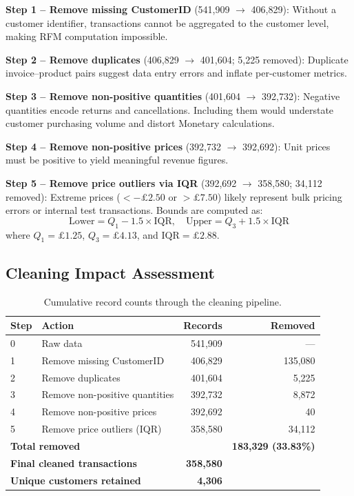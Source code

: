 \documentclass[10pt,a4paper]{article}
\begin{document}
\textbf{Step 1 -- Remove missing CustomerID} (541,909 $\to$ 406,829): Without a
customer identifier, transactions cannot be aggregated to the customer level, making
RFM computation impossible.

\textbf{Step 2 -- Remove duplicates} (406,829 $\to$ 401,604; 5,225 removed): Duplicate
invoice--product pairs suggest data entry errors and inflate per-customer metrics.

\textbf{Step 3 -- Remove non-positive quantities} (401,604 $\to$ 392,732): Negative
quantities encode returns and cancellations.  Including them would understate customer
purchasing volume and distort Monetary calculations.

\textbf{Step 4 -- Remove non-positive prices} (392,732 $\to$ 392,692): Unit prices
must be positive to yield meaningful revenue figures.

\textbf{Step 5 -- Remove price outliers via IQR} (392,692 $\to$ 358,580; 34,112
removed): Extreme prices ($< -\pounds2.50$ or $> \pounds7.50$) likely represent bulk
pricing errors or internal test transactions.  Bounds are computed as:
\[
  \text{Lower} = Q_1 - 1.5 \times \text{IQR}, \quad
  \text{Upper} = Q_3 + 1.5 \times \text{IQR}
\]
where $Q_1 = \pounds1.25$, $Q_3 = \pounds4.13$, and $\text{IQR} = \pounds2.88$.

\subsection{Cleaning Impact Assessment}

\begin{table}[H]
  \centering
  \caption{Cumulative record counts through the cleaning pipeline.}
  \label{tab:cleaning}
  \begin{tabular}{llrr}
    \toprule
    \textbf{Step} & \textbf{Action} & \textbf{Records} & \textbf{Removed} \\
    \midrule
    0 & Raw data                          & 541,909 & ---    \\
    1 & Remove missing CustomerID         & 406,829 & 135,080 \\
    2 & Remove duplicates                 & 401,604 & 5,225  \\
    3 & Remove non-positive quantities    & 392,732 & 8,872  \\
    4 & Remove non-positive prices        & 392,692 & 40     \\
    5 & Remove price outliers (IQR)       & 358,580 & 34,112 \\
    \midrule
    \multicolumn{2}{l}{\textbf{Total removed}} & & \textbf{183,329 (33.83\%)} \\
    \multicolumn{2}{l}{\textbf{Final cleaned transactions}} & \textbf{358,580} & \\
    \multicolumn{2}{l}{\textbf{Unique customers retained}} & \textbf{4,306} & \\
    \bottomrule
  \end{tabular}
\end{table}
\end{document}
